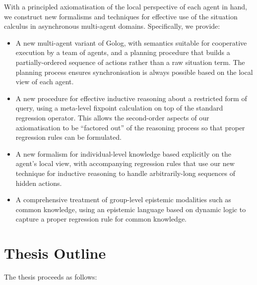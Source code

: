 With a principled axiomatisation of the local perspective of each
agent in hand, we construct new formalisms and techniques for effective
use of the situation calculus in asynchronous multi-agent domains.
Specifically, we provide:

\begin{itemize}
\item A new multi-agent variant of Golog, with semantics suitable for cooperative
execution by a team of agents, and a planning procedure that builds
a partially-ordered sequence of actions rather than a raw situation
term. The planning process ensures synchronisation is always possible
based on the local view of each agent. 
\item A new procedure for effective inductive reasoning about a restricted
form of query, using a meta-level fixpoint calculation on top of the
standard regression operator. This allows the second-order aspects
of our axiomatisation to be {}``factored out'' of the reasoning
process so that proper regression rules can be formulated. 
\item A new formalism for individual-level knowledge based explicitly on
the agent's local view, with accompanying regression rules that use
our new technique for inductive reasoning to handle arbitrarily-long
sequences of hidden actions. 
\item A comprehensive treatment of group-level epistemic modalities such
as common knowledge, using an epistemic language based on dynamic
logic to capture a proper regression rule for common knowledge. 
\end{itemize}
\newpage{}


\section{Thesis Outline}

The thesis proceeds as follows:

